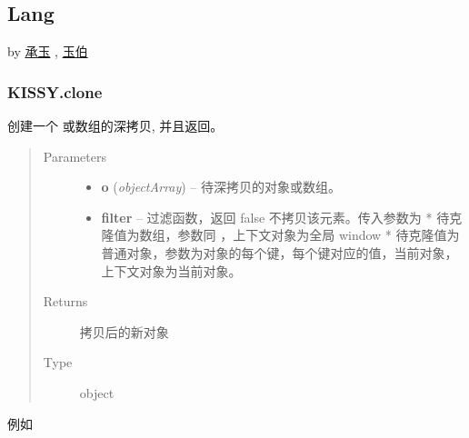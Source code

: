 \documentclass[letterpaper,10pt,english]{sphinxmanual}
\begin{document}
\label{api/seed/lang/index:module-Lang}

\subsection{Lang}
\label{api/seed/lang/index:lang}\label{api/seed/lang/index::doc}
by \href{mailto:yiminghe@gmail.com}{承玉} , \href{mailto:lifesinger@gmail.com}{玉伯}


\subsubsection{KISSY.clone}
\label{api/seed/lang/clone:kissy-clone}\label{api/seed/lang/clone::doc}

\begin{fulllineitems}
\label{api/seed/lang/clone:Lang.KISSY.clone}
创建一个 {\hyperref[api/seed/lang/isPlainObject:Lang.KISSY.isPlainObject]{}} 或数组的深拷贝, 并且返回。
\begin{quote}\begin{description}
\item[{Parameters}] \leavevmode\begin{itemize}
\item {}
\textbf{o} (\emph{object\textbar{}Array}) -- 待深拷贝的对象或数组。

\item {}
\textbf{filter} -- 过滤函数，返回 false 不拷贝该元素。传入参数为
* 待克隆值为数组，参数同 {\hyperref[api/seed/lang/filter:Lang.KISSY.filter]{}} ，上下文对象为全局 window
* 待克隆值为普通对象，参数为对象的每个键，每个键对应的值，当前对象，上下文对象为当前对象。

\end{itemize}

\item[{Returns}] \leavevmode
拷贝后的新对象

\item[{Type }] \leavevmode
object

\end{description}\end{quote}

\end{fulllineitems}


例如
\end{document}
